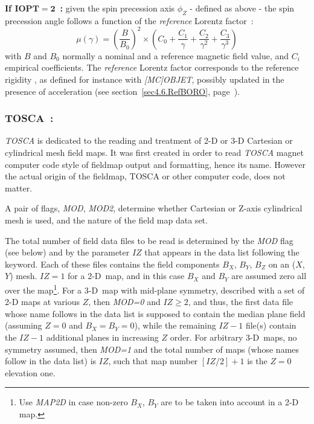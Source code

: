 \bigskip

\noindent \textbf{If $\mathbf{IOPT  =  2}$~:}  given the spin precession axis $\phi_Z$ - defined as  above -  
   the spin precession angle follows a function of the \textsl{reference} Lorentz factor~: 
  $$\mu (\gamma) = \left(\frac{B}{B_0}\right)^2 \times \left( C_0 + \frac{C_1}{\gamma} + \frac{C_2}{\gamma^2}  + \frac{C_3}{\gamma^3} \right) $$
 with $B$ and $B_0$ normally  a nominal and a reference magnetic field value, and $C_i$ empirical coefficients. 
The \textsl{reference} Lorentz factor corresponds to the reference rigidity 
 \BORO, as defined for instance with \textsl{[MC]OBJET}, possibly updated in the presence of acceleration 
(see section~\ref{sec4.6.RefBORO}, page~\pageref{sec4.6.RefBORO}). 

\newpage

\subsubsection*{TOSCA~: \TOSCATitl} \label{TOSCA} 
\medskip

 \textsl{TOSCA} is dedicated to the reading and treatment of 2-D or 
3-D Cartesian or cylindrical mesh field maps.  It was first created in order to read 
\textsl{TOSCA}  magnet computer code style of fieldmap  output and  formatting, hence its name. However 
the actual origin of the fieldmap, TOSCA or other computer code, does not matter. 

\medskip

\noindent A pair of flags, \textsl{MOD}, \textsl{MOD2}, determine whether Cartesian or Z-axis cylindrical mesh is used, 
and the nature of the field map data set.

\medskip

\noindent The total number of field data files to be read is determined by the \textsl{MOD} flag 
(see below) and by the parameter $IZ$ that appears in the data list following the keyword. 
Each of these files contains the field components $B_X$, $B_Y$, $B_Z$ on an 
\mbox{($X$, $Y$)} mesh. $IZ = 1$ for a 2-D~map, and 
in this case $B_X$ and $B_Y$ are assumed  zero all over the map\footnote{Use 
\textsl{MAP2D} in case non-zero $B_X$, $B_Y$ are to be taken into account in a 2-D map.}. 
For a 3-D~map with mid-plane symmetry, described with a set of 2-D maps at various $Z$, 
then  \textsl{MOD=0} and  $IZ\ge 2$, and thus, the first 
data file whose name follows in the data list is supposed to contain the median 
plane field (assuming $ Z=0 $ and  $ B_X=B_Y=0$), while the remaining  $IZ-1$ 
file(s) contain the $IZ-1$ additional  planes in increasing $Z$ order. For arbitrary 3-D~maps, 
 no  symmetry assumed, then  \textsl{MOD=1} and  
 the total number of maps (whose names follow in the data list) 
is $IZ$, such that  map number $[IZ/2]+1$ is the $Z = 0$ elevation one.

